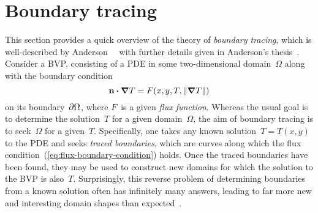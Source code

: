 \section{Boundary tracing}

This section provides a quick overview of
the theory of \emph{boundary tracing},
which is well-described by
Anderson~\etal~\cite{anderson-2007-boundary-tracing-i-theory}
with further details given in
Anderson's thesis~\cite{anderson-2002-thesis-boundary-tracing-pdes}.
Consider a BVP\@, consisting of
a PDE in some two-dimensional domain~$\Omega$
along with the boundary condition
\begin{equation}
  \mathop{}\!\boldsymbol{\mathrm{n}} \boldsymbol{\cdot} \mathop{}\!\boldsymbol{\mathrm{\nabla}} T = F (x, y, T, \lVert\mathop{}\!\boldsymbol{\mathrm{\nabla}} T\rVert)
  \label{eq:flux-boundary-condition}
\end{equation}
on its boundary~$\mathop{}\!\partial\Omega$,
where $F$~is a given \emph{flux function}.
Whereas the usual goal is
to determine the solution~$T$ for a given domain~$\Omega$,
the aim of boundary tracing is
to seek~$\Omega$ for a given~$T$.
Specifically, one takes any known solution~$T = T (x, y)$ to the PDE
and seeks \emph{traced boundaries}, which are curves
along which the flux condition~(\ref{eq:flux-boundary-condition}) holds.
Once the traced boundaries have been found,
they may be used to construct new domains
for which the solution to the BVP is also~$T$.
Surprisingly, this reverse problem
of determining boundaries from a known solution
often has infinitely many answers,
leading to far more new and interesting domain shapes
than expected~\cite{anderson-2007-boundary-tracing-ii-applications}.
